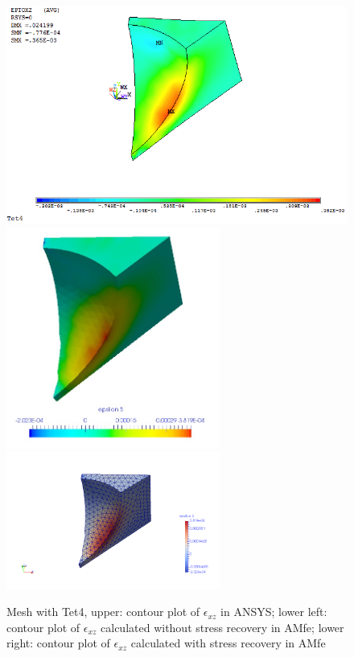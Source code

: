 \begin{figure}[htbp]
	\begin{center}
		\includegraphics[width=13cm,clip]{Tet4Exz.png} 	
		\includegraphics[width=7cm,clip]{Tet4ExzPD.png} 	
		\includegraphics[width=7cm,clip]{Tet4ExzP.png} 		
		\caption{Mesh with Tet4, upper: contour plot of $\epsilon_{xz}$ in ANSYS; lower left: contour plot of $\epsilon_{xz}$ calculated without stress recovery in AMfe; lower right: contour plot of $\epsilon_{xz}$ calculated with stress recovery in AMfe} \label{fig: Tet4_Exz}
	\end{center}
\end{figure}
\clearpage 

